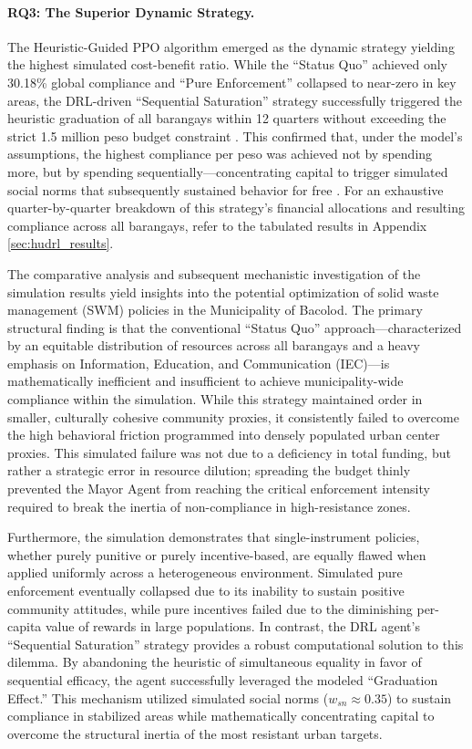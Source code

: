 \paragraph{RQ3: The Superior Dynamic Strategy.}

The Heuristic-Guided PPO algorithm emerged as the dynamic strategy yielding the highest simulated cost-benefit ratio. While the ``Status Quo'' achieved only 30.18\% global compliance and ``Pure Enforcement'' collapsed to near-zero in key areas, the DRL-driven ``Sequential Saturation'' strategy successfully triggered the heuristic graduation of all barangays within 12 quarters without exceeding the strict 1.5 million peso budget constraint \citep{Jimenez2025}. This confirmed that, under the model's assumptions, the highest compliance per peso was achieved not by spending more, but by spending sequentially—concentrating capital to trigger simulated social norms that subsequently sustained behavior for free \citep{ZhengAI2022}. For an exhaustive quarter-by-quarter breakdown of this strategy's financial allocations and resulting compliance across all barangays, refer to the tabulated results in Appendix \ref{sec:hudrl_results}.

The comparative analysis and subsequent mechanistic investigation of the simulation results yield insights into the potential optimization of solid waste management (SWM) policies in the Municipality of Bacolod. The primary structural finding is that the conventional ``Status Quo'' approach---characterized by an equitable distribution of resources across all barangays and a heavy emphasis on Information, Education, and Communication (IEC)---is mathematically inefficient and insufficient to achieve municipality-wide compliance within the simulation. While this strategy maintained order in smaller, culturally cohesive community proxies, it consistently failed to overcome the high behavioral friction programmed into densely populated urban center proxies. This simulated failure was not due to a deficiency in total funding, but rather a strategic error in resource dilution; spreading the budget thinly prevented the Mayor Agent from reaching the critical enforcement intensity required to break the inertia of non-compliance in high-resistance zones.

Furthermore, the simulation demonstrates that single-instrument policies, whether purely punitive or purely incentive-based, are equally flawed when applied uniformly across a heterogeneous environment. Simulated pure enforcement eventually collapsed due to its inability to sustain positive community attitudes, while pure incentives failed due to the diminishing per-capita value of rewards in large populations. In contrast, the DRL agent’s ``Sequential Saturation'' strategy provides a robust computational solution to this dilemma. By abandoning the heuristic of simultaneous equality in favor of sequential efficacy, the agent successfully leveraged the modeled ``Graduation Effect.'' This mechanism utilized simulated social norms ($w_{sn} \approx 0.35$) to sustain compliance in stabilized areas while mathematically concentrating capital to overcome the structural inertia of the most resistant urban targets.

